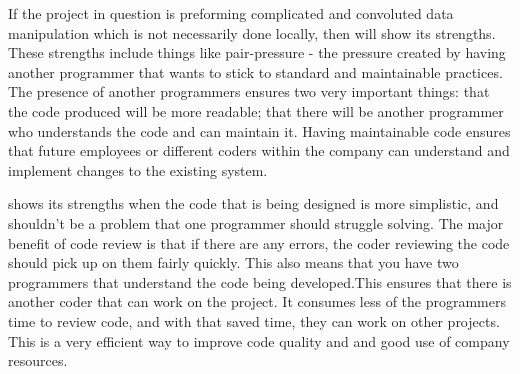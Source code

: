 \documentclass{article}
\begin{document}
If the project in question is preforming complicated and convoluted data manipulation which is not necessarily done locally, then \PP will show its strengths. These strengths include things like pair-pressure\cite{William} - the pressure created by having another programmer that wants to stick to standard and maintainable practices. The presence of another programmers ensures two very important things: that the code produced will be more readable; that there will be another programmer who understands the code and can maintain it. Having maintainable code ensures that future employees or different coders within the company can understand and implement changes to the existing system. 

\CR shows its strengths when the code that is being designed is more simplistic, and shouldn't be a problem that one programmer should struggle solving. The major benefit of code review is that if there are any errors, the coder reviewing the code should pick up on them fairly quickly. This also means that you have two programmers that understand the code being developed.This ensures that there is another coder that can work on the project. It consumes less of the programmers time to review code, and with that saved time, they can work on other projects. This is a very efficient way to improve code quality and and good use of company resources. 





\end{document}
